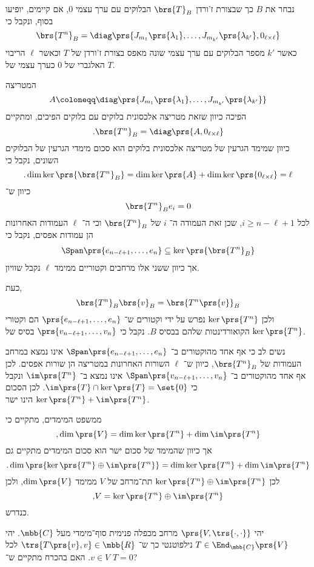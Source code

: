 \documentclass[a4paper,10pt,twoside,openany]{article}
\begin{document}
\begin{solution}
\begin{description}
נבחר את
$B$
כך שבצורת ז'ורדן
$\brs{T}_B$
הבלוקים עם ערך עצמי
$0$,
אם קיימים, יופיעו בסוף, ונקבל כי
\[\brs{T^n}_B = \diag\prs{J_{m_1}\prs{\lambda_1}, \ldots, J_{m_{k'}}\prs{\lambda_{k'}}, 0_{\ell \times \ell}}\]
כאשר
$k'$
מספר הבלוקים עם ערך עצמי שונה מאפס בצורת ז'ורדן של
$T$
וכאשר
$\ell$
הריבוי האלגברי של
$0$
כערך עצמי של
$T$.

המטריצה
\[A \coloneqq \diag\prs{J_{m_1}\prs{\lambda_1}, \ldots, J_{m_{k'}}\prs{\lambda_{k'}}}\]
הפיכה כיוון שזאת מטריצה אלכסונית בלוקים עם בלוקים הפיכים, ומתקיים
\[\text{.} \brs{T^n}_B = \diag\prs{A, 0_{\ell \times \ell}}\]
כיוון שמימד הגרעין של מטריצה אלכסונית בלוקים הוא סכום מימדי הגרעין של הבלוקים השונים, נקבל כי
\[\text{.} \dim \ker\prs{ \brs{T^n}_B } = \dim \ker\prs{A} + \dim \ker\prs{0_{\ell \times \ell}} = \ell\]
כיוון ש־%
\[\brs{T^n}_B e_i = 0\]
לכל
$i \geq n - \ell + 1$,
שכן זאת העמודה ה־%
$i$
של
$\brs{T^n}_B$
וכי ה־%
$\ell$
העמודות האחרונות הן עמודות אפסים, נקבל כי
\begin{align*}
\Span \prs{e_{n - \ell + 1}, \ldots, e_n} \subseteq \ker\prs{\brs{T^n}_B}
\end{align*}
אך כיוון ששני אלו מרחבים וקטוריים ממימד
$\ell$
נקבל שוויון.

כעת,
\[\brs{T^n}_B \brs{v}_B = \brs{T^n\prs{v}}_B\]
ולכן
$\ker\prs{T^n}$
נפרש על ידי וקטורים ש־%
$\prs{e_{n - \ell + 1}, \ldots, e_n}$
הם וקטורי הקואורדינטות שלהם בבסיס
$B$.
נקבל כי
$\prs{v_{n - \ell + 1}, \ldots, v_n}$
בסיס של
$\ker\prs{T^n}$.

נשים לב כי אף אחד מהוקטורים ב־%
$\Span\prs{e_{n - \ell + 1}, \ldots, e_n}$
אינו נמצא במרחב העמודות של
$\brs{T^n}_B$,
כיוון ש־%
$\ell$
השורות האחרונות במטריצה הן שורות אפסים.
לכן אף אחד מהוקטורים ב־%
$\Span \prs{v_{n - \ell + 1}, \ldots, v_n}$
אינו נמצא ב־%
$\im\prs{T^n}$
ונקבל כי
$\im\prs{T} \cap \ker\prs{T} = \set{0}$.
לכן הסכום
$\ker\prs{T^n} + \im\prs{T^n}$
הינו ישר.

ממשפט המימדים, מתקיים כי
\[\text{,} \dim\prs{V} = \dim\ker\prs{T^n} + \dim\im\prs{T^n}\]
אך כיוון שהמימד של סכום ישר הוא סכום המימדים מתקיים גם
\[\text{.} \dim\prs{\ker\prs{T^n} \oplus \im\prs{T^n}} = \dim \ker\prs{T^n} + \dim \im \prs{T^n}\]
לכן
$\ker\prs{T^n} \oplus \im\prs{T^n}$
תת־מרחב של
$V$
ממימד
$\dim\prs{V}$,
ולכן
\[\text{,} V = \ker\prs{T^n} \oplus \im\prs{T^n}\]
כנדרש.
\end{description}

\end{solution}

\newpage

\begin{question}
יהי
$\prs{V, \trs{\cdot, \cdot}}$
מרחב מכפלה פנימית סוף־מימדי מעל
$\mbb{C}$.
יהי
$T \in \End_{\mbb{C}}\prs{V}$
נילפוטנטי כך ש־%
$\trs{T\prs{v}, v} \in \mbb{R}$
לכל
$v \in V$.
האם בהכרח מתקיים ש־%
$T = 0$?
\end{question}
\end{document}
